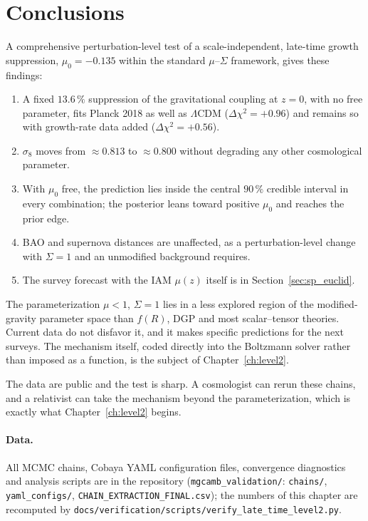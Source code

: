 \section{Conclusions}\label{sec:lt_conclusions}
A comprehensive perturbation-level test of a scale-independent, late-time growth suppression, $\mu_0=-0.135$ within the standard $\mu$--$\Sigma$
framework, gives these findings:
\begin{enumerate}
\item A fixed $13.6\,\%$ suppression of the gravitational coupling at $z=0$, with no free parameter, fits Planck 2018 as well as $\Lambda$CDM
($\Delta\chi^2=+0.96$) and remains so with growth-rate data added ($\Delta\chi^2=+0.56$).
\item $\sigma_8$ moves from $\approx0.813$ to $\approx0.800$ without degrading any other cosmological parameter.
\item With $\mu_0$ free, the prediction lies inside the central $90\,\%$ credible interval in every combination; the posterior leans toward positive
$\mu_0$ and reaches the prior edge.
\item BAO and supernova distances are unaffected, as a perturbation-level change with $\Sigma=1$ and an unmodified background requires.
\item The survey forecast with the IAM $\mu(z)$ itself is in Section~\ref{sec:sp_euclid}.
\end{enumerate}
The parameterization $\mu<1$, $\Sigma=1$ lies in a less explored region of the modified-gravity parameter space than $f(R)$, DGP and most
scalar--tensor theories. Current data do not disfavor it, and it makes specific predictions for the next surveys. The mechanism itself, coded
directly into the Boltzmann solver rather than imposed as a function, is the subject of Chapter~\ref{ch:level2}.

The data are public and the test is sharp. A cosmologist can rerun these chains, and a relativist can take the mechanism beyond the parameterization, which is exactly what Chapter~\ref{ch:level2} begins.

\paragraph{Data.} All MCMC chains, Cobaya YAML configuration files, convergence diagnostics and analysis scripts are in the repository
(\texttt{mgcamb\_validation/}: \texttt{chains/}, \texttt{yaml\_configs/}, \texttt{CHAIN\_EXTRACTION\_FINAL.csv}); the numbers of this chapter are
recomputed by \texttt{docs/\allowbreak{}verification/\allowbreak{}scripts/\allowbreak{}verify\_late\_time\_level2.py}.
